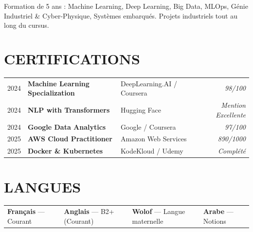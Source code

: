 \documentclass[10pt, a4paper]{article}
\begin{document}
\vspace{3pt}

{\small Formation de 5 ans : Machine Learning, Deep Learning, Big Data, MLOps, Génie Industriel \& Cyber-Physique, Systèmes embarqués. Projets industriels tout au long du cursus.}

\section{CERTIFICATIONS}

\begin{tabularx}{\linewidth}{@{} l l X r @{}}
  2024 & \textbf{Machine Learning Specialization}     & DeepLearning.AI / Coursera  & \textit{98/100} \\
  2024 & \textbf{NLP with Transformers}               & Hugging Face                & \textit{Mention Excellente} \\
  2024 & \textbf{Google Data Analytics}               & Google / Coursera           & \textit{97/100} \\
  2025 & \textbf{AWS Cloud Practitioner}              & Amazon Web Services         & \textit{890/1000} \\
  2025 & \textbf{Docker \& Kubernetes}                & KodeKloud / Udemy           & \textit{Complété} \\
\end{tabularx}

\section{LANGUES}

\begin{tabularx}{\linewidth}{@{} X X X X @{}}
  \textbf{Français} — Courant &
  \textbf{Anglais} — B2+ (Courant) &
  \textbf{Wolof} — Langue maternelle &
  \textbf{Arabe} — Notions \\
\end{tabularx}

\end{document}
